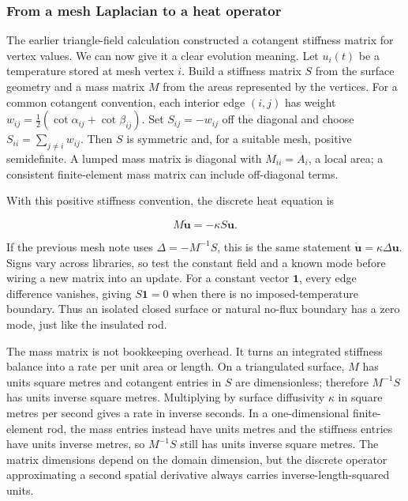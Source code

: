 \subsubsection{From a mesh Laplacian to a heat operator}\label{02-foundations-ii-ch025-from-a-mesh-laplacian-to-a-heat-operator}

The earlier triangle-field calculation constructed a cotangent stiffness matrix for vertex values. We can now give it a clear evolution meaning. Let \(u_i(t)\) be a temperature stored at mesh vertex \(i\). Build a stiffness matrix \(S\) from the surface geometry and a mass matrix \(M\) from the areas represented by the vertices. For a common cotangent convention, each interior edge \((i,j)\) has weight \(w_{ij}=\tfrac12(\cot\alpha_{ij}+\cot\beta_{ij})\). Set \(S_{ij}=-w_{ij}\) off the diagonal and choose \(S_{ii}=\sum_{j\ne i}w_{ij}\). Then \(S\) is symmetric and, for a suitable mesh, positive semidefinite. A lumped mass matrix is diagonal with \(M_{ii}=A_i\), a local area; a consistent finite-element mass matrix can include off-diagonal terms.

With this positive stiffness convention, the discrete heat equation is

\[
M\dot{\mathbf u}=-\kappa S\mathbf u.
\]

If the previous mesh note uses \(\Delta=-M^{-1}S\), this is the same statement \(\dot{\mathbf u}=\kappa\Delta\mathbf u\). Signs vary across libraries, so test the constant field and a known mode before wiring a new matrix into an update. For a constant vector \(\mathbf 1\), every edge difference vanishes, giving \(S\mathbf 1=0\) when there is no imposed-temperature boundary. Thus an isolated closed surface or natural no-flux boundary has a zero mode, just like the insulated rod.

The mass matrix is not bookkeeping overhead. It turns an integrated stiffness balance into a rate per unit area or length. On a triangulated surface, \(M\) has units square metres and cotangent entries in \(S\) are dimensionless; therefore \(M^{-1}S\) has units inverse square metres. Multiplying by surface diffusivity \(\kappa\) in square metres per second gives a rate in inverse seconds. In a one-dimensional finite-element rod, the mass entries instead have units metres and the stiffness entries have units inverse metres, so \(M^{-1}S\) still has units inverse square metres. The matrix dimensions depend on the domain dimension, but the discrete operator approximating a second spatial derivative always carries inverse-length-squared units.

